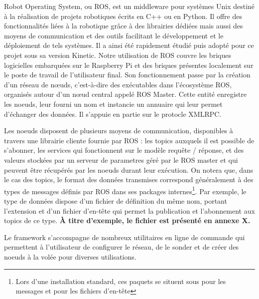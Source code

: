 Robot Operating System, ou \gls{ROS}, est un middleware pour systèmes Unix destiné à la réalisation de projets robotiques écrits en C++ ou en Python.
Il offre des fonctionnalités liées à la robotique grâce à des librairies dédiées mais aussi des moyens de communication et des outils facilitant le développement et le déploiement de tels systèmes. 
Il a ainsi été rapidement étudié puis adopté pour ce projet sous sa version Kinetic. 
Notre utilisation de \gls{ROS} couvre les briques logicielles embarquées sur le Raspberry Pi et des briques présentes localement sur le poste de travail de l'utilisateur final. 
Son fonctionnement passe par la création d'un réseau de n\oe{}uds\cite{Bib_ROS_nodes}, c'est-à-dire des exécutables dans l'écosystème \gls{ROS}, organisés autour d'un n\oe{}ud central appelé \gls{ROS} Master\cite{Bib_ROS_master}.
Cette entité enregistre les noeuds, leur fourni un nom et instancie un annuaire qui leur permet d'échanger des données. 
Il s'appuie en partie sur le protocle \gls{XMLRPC}.

Les noeuds disposent de plusieurs moyens de communication, disponibles à travers une librairie cliente fournie par \gls{ROS} : les \gls{topics}\cite{Bib_ROS_topics} auxquels il est possible de s'abonner, 
les \gls{services}\cite{Bib_ROS_services} qui fonctionnent sur le modèle requête / réponse, et des valeurs stockées par un \gls{serveur de parametres} géré par le \gls{ROS} master et qui peuvent être récupérés par les noeuds durant leur exécution.
On notera que, dans le cas des topics, le format des données transmises correspond généralement à des types de messages définis par \gls{ROS} dans ses packages 
internes\footnote{Lors d'une installation standard, ces paquets se situent sous  pour les messages et  pour les fichiers d'en-tête}. 
Par exemple, le type de données  dispose d'un fichier de définition du même nom, portant l'extension  et d'un fichier d'en-tête qui permet la publication et l'abonnement aux topics 
de ce type. \textbf{\`{A} titre d'exemple, le fichier  est présenté en annexe X.}

Le framework s'accompagne de nombreux utilitaires en ligne de commande qui permettent à l'utilisateur de configurer le réseau, de le sonder et de créer des noeuds à la volée pour diverses utilisations.

